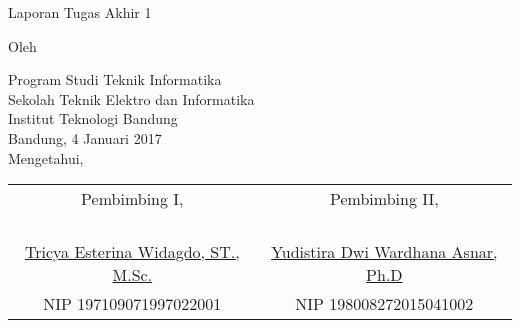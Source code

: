 \clearpage
\pagestyle{empty}

\begin{center}
\smallskip

    \Large \bfseries \MakeUppercase{\thetitle}
    \vfill

    \Large Laporan Tugas Akhir 1
    \vfill

    \large Oleh

    \Large \theauthor

    \large Program Studi Teknik Informatika \\
    \normalsize \normalfont
    Sekolah Teknik Elektro dan Informatika \\
    Institut Teknologi Bandung \\

    \vfill
    \normalsize \normalfont
    Bandung, 4 Januari 2017 \\
    Mengetahui,

    \vfill
    \setlength{\tabcolsep}{12pt}
    \begin{tabular}{c@{\hskip 0.5in}c}
        Pembimbing I, & Pembimbing II, \\
        & \\
        & \\
        & \\
        & \\
        \underline{Tricya Esterina Widagdo, ST., M.Sc.} & \underline{Yudistira Dwi Wardhana Asnar, Ph.D} \\
        NIP 197109071997022001 & NIP 198008272015041002 \\
    \end{tabular}

\end{center}
\clearpage
